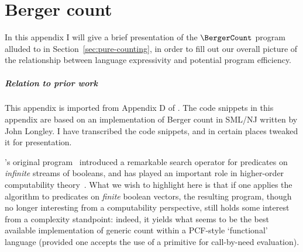 \documentclass[12pt,phd,lfcs,twoside,openright,logo,leftchapter,normalheadings]{infthesis}
\theoremstyle{plain}
\theoremstyle{definition}
\begin{document}
\chapter{Berger count}
\label{sec:berger-count}
In this appendix I will give a brief presentation of the
$\BergerCount$ program alluded to in Section~\ref{sec:pure-counting},
in order to fill out our overall picture of the relationship between
language expressivity and potential program efficiency.

\paragraph{Relation to prior work} This appendix is imported from
Appendix D of \citet{HillerstromLL20a}. The code snippets in this
appendix are based on an implementation of Berger count in SML/NJ
written by John Longley. I have transcribed the code snippets, and in
certain places tweaked it for presentation.\medskip

\citeauthor{Berger90}'s original program~\cite{Berger90} introduced a
remarkable search operator for predicates on \emph{infinite} streams
of booleans, and has played an important role in higher-order
computability theory~\cite{LongleyN15}.  What we wish to highlight
here is that if one applies the algorithm to predicates on
\emph{finite} boolean vectors, the resulting program, though no longer
interesting from a computability perspective, still holds some
interest from a complexity standpoint: indeed, it yields what seems to
be the best available implementation of generic count within a
PCF-style `functional' language (provided one accepts the use of a
primitive for call-by-need evaluation).
\end{document}
